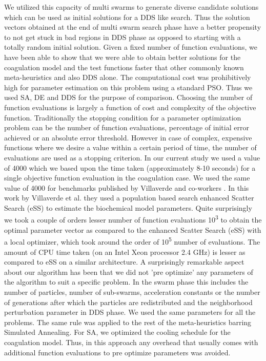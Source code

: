 \documentclass[12pt]{article}
\begin{document}
We utilized this capacity of multi swarms to generate diverse candidate solutions which can be used as initial solutions for a DDS like search. Thus the solution vectors obtained at the end of multi swarm search phase have a better propensity to not get stuck in bad regions in DDS phase as opposed to starting with a totally random initial solution. Given a fixed number of function evaluations, we have been able to show that we were able to obtain better solutions for the coagulation model and the test functions faster that other commonly known meta-heuristics and also DDS alone. The computational cost was prohibitively high for parameter estimation on this problem using a standard PSO. Thus we used SA, DE and DDS for the purpose of comparison. Choosing the number of function evaluations is largely a function of cost and complexity of the objective function. Traditionally the stopping condition for a parameter optimization problem can be the number of function evaluations, percentage of initial error achieved or an absolute error threshold. However in case of complex, expensive functions where we desire a value within a certain period of time, the number of evaluations are used as a stopping criterion. In our current study we used a value of 4000 which we based upon the time taken (approximately 8-10 seconds) for a single objective function evaluation in the coagulation case. We used the same value of 4000 for benchmarks published by Villaverde and co-workers \cite{villaverde2015biopredyn}. In this work by Villaverde et al. they used a population based search enhanced Scatter Search (eSS) to estimate the biochemical model parameters. Quite surprisingly we took a couple of orders lesser number of function evaluations 10\textsuperscript{3} to obtain the optimal parameter vector as compared to the enhanced Scatter Search (eSS) with a local optimizer, which took around the order of 10\textsuperscript{5} number of evaluations.  The amount of CPU time taken (on an Intel Xeon processor 2.4 GHz) is lesser as compared to eSS on a similar architecture.
A surprisingly remarkable aspect about our algorithm has been that we did not 'pre optimize' any parameters of the algorithm to suit a specific problem. In the swarm phase this includes the number of particles, number of sub-swarms, acceleration constants or the number of generations after which the particles are redistributed and the neighborhood perturbation parameter in DDS phase. We used the same parameters for all the problems. The same rule was applied to the rest of the meta-heuristics barring Simulated Annealing. For SA, we optimized the cooling schedule for the coagulation model. Thus, in this approach any overhead that usually comes with additional function evaluations to pre optimize parameters was avoided.
\end{document}
